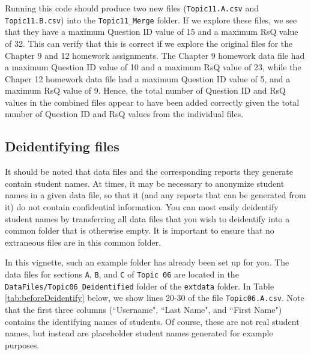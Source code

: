\documentclass{article}\usepackage[]{graphicx}\usepackage[]{color}
\numberwithin{equation}{section} %
\begin{document}
Running this code should produce two new files (\texttt{Topic11.A.csv} and \texttt{Topic11.B.csv}) into the \texttt{Topic11\_Merge} folder. If we explore these files, we see that they have a maximum Question ID value of 15 and a maximum RsQ value of 32. This can verify that this is correct if we explore the original files for the Chapter 9 and 12 homework assignments. The Chapter 9 homework data file had a maximum Question ID value of 10 and a maximum RsQ value of 23, while the Chaper 12 homework data file had a maximum Question ID value of 5, and a maximum RsQ value of 9. Hence, the total number of Question ID and RsQ values in the combined files appear to have been added correctly given the total number of Question ID and RsQ values from the individual files.

\subsection{Deidentifying files}

It should be noted that data files and the corresponding reports they generate contain student names. At times, it may be necessary to anonymize student names in a given data file, so that it (and any reports that can be generated from it) do not contain confidential information. You can most easily deidentify student names by transferring all data files that you wish to deidentify into a common folder that is otherwise empty. It is important to ensure that no extraneous files are in this common folder.

In this vignette, such an example folder has already been set up for you. The data files for sections \texttt{A}, \texttt{B}, and \texttt{C} of \texttt{Topic 06} are located in the \texttt{DataFiles/Topic06\_Deidentified} folder of the \texttt{extdata} folder. In Table \ref{tab:beforeDeidentify} below, we show lines 20-30 of the file \texttt{Topic06.A.csv}. Note that the first three columns (``Username", ``Last Name", and ``First Name") contains the identifying names of students. Of course, these are not real student names, but instead are placeholder student names generated for example purposes. \\
\end{document}
